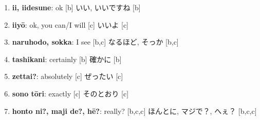 \documentclass[uplatex,dvipdfmx,b5paper,english,10pt]{jsbook}
\begin{document}
\begin{enumerate}
  \item
    \ifEnglish
    {\bfseries ii, iidesune}: ok [b]%
    \else
    いい, いいですね [b]
    \fi
  \item
    \ifEnglish
    {\bfseries iiy\=o}: ok, you can/I will [c]%
    \else
    いいよ [c]
    \fi
\item
  \ifEnglish
  {\bfseries naruhodo, sokka}: I see [b,c]%
  \else
  なるほど, そっか [b,c]
  \fi
\item
  \ifEnglish
  {\bfseries tashikani}: certainly [b]%
  \else
  確かに [b]
  \fi
\item
  \ifEnglish
  {\bfseries zettai?}: absolutely [c]%
  \else
  ぜったい [c]
  \fi
\item
  \ifEnglish
  {\bfseries sono t\=ori}: exactly [c]%
  \else
  そのとおり [c]
  \fi
\item
  \ifEnglish
  {\bfseries honto ni?, maji de?, h\=e?}: really? [b,c,c]%
  \else
  ほんとに, マジで？, へぇ？ [b,c,c]
  \fi

\end{enumerate}
\end{document}
